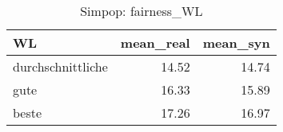 \begin{table}[ht]
\centering
\begin{tabular}{lrr}
  \hline
WL & mean\_real & mean\_syn \\ 
  \hline
durchschnittliche & 14.52 & 14.74 \\ 
  gute & 16.33 & 15.89 \\ 
  beste & 17.26 & 16.97 \\ 
   \hline
\end{tabular}
\caption{Simpop: fairness_WL} 
\end{table}
